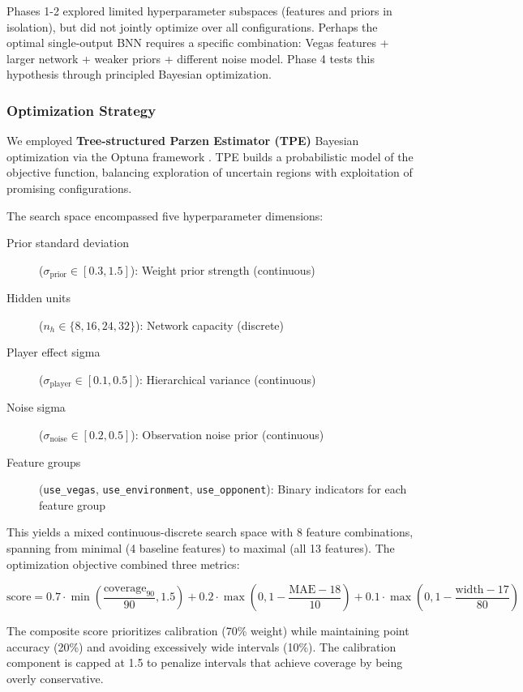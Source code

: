 Phases 1-2 explored limited hyperparameter subspaces (features and priors in isolation), but did not jointly optimize over all configurations. Perhaps the optimal single-output BNN requires a specific combination: Vegas features + larger network + weaker priors + different noise model. Phase 4 tests this hypothesis through principled Bayesian optimization.

\subsubsection{Optimization Strategy}

We employed \textbf{Tree-structured Parzen Estimator (TPE)} Bayesian optimization via the Optuna framework \citep{akiba2019optuna}. TPE builds a probabilistic model of the objective function, balancing exploration of uncertain regions with exploitation of promising configurations.

The search space encompassed five hyperparameter dimensions:

\begin{description}
    \item[Prior standard deviation] ($\sigma_{\text{prior}} \in [0.3, 1.5]$): Weight prior strength (continuous)
    \item[Hidden units] ($n_h \in \{8, 16, 24, 32\}$): Network capacity (discrete)
    \item[Player effect sigma] ($\sigma_{\text{player}} \in [0.1, 0.5]$): Hierarchical variance (continuous)
    \item[Noise sigma] ($\sigma_{\text{noise}} \in [0.2, 0.5]$): Observation noise prior (continuous)
    \item[Feature groups] (\texttt{use\_vegas}, \texttt{use\_environment}, \texttt{use\_opponent}): Binary indicators for each feature group
\end{description}

This yields a mixed continuous-discrete search space with 8 feature combinations, spanning from minimal (4 baseline features) to maximal (all 13 features). The optimization objective combined three metrics:

\begin{equation}
    \text{score} = 0.7 \cdot \min\left(\frac{\text{coverage}_{90}}{90}, 1.5\right) + 0.2 \cdot \max\left(0, 1 - \frac{\text{MAE} - 18}{10}\right) + 0.1 \cdot \max\left(0, 1 - \frac{\text{width} - 17}{80}\right)
\end{equation}

The composite score prioritizes calibration (70\% weight) while maintaining point accuracy (20\%) and avoiding excessively wide intervals (10\%). The calibration component is capped at 1.5 to penalize intervals that achieve coverage by being overly conservative.

